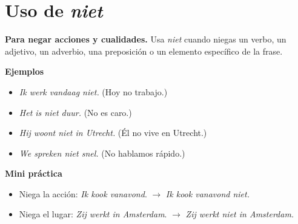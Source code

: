 \section{Uso de \textit{niet}}
\textbf{Para negar acciones y cualidades.} Usa \textit{niet} cuando niegas un verbo, un adjetivo, un adverbio, una preposición o un elemento específico de la frase.

\textbf{Ejemplos}
\begin{itemize}[leftmargin=*]
  \item \textit{Ik werk vandaag niet.} (Hoy no trabajo.)
  \item \textit{Het is niet duur.} (No es caro.)
  \item \textit{Hij woont niet in Utrecht.} (Él no vive en Utrecht.)
  \item \textit{We spreken niet snel.} (No hablamos rápido.)
\end{itemize}

\textbf{Mini práctica}
\begin{itemize}[leftmargin=*]
  \item Niega la acción: \textit{Ik kook vanavond}. $\rightarrow$ \textit{Ik kook vanavond niet.}
  \item Niega el lugar: \textit{Zij werkt in Amsterdam}. $\rightarrow$ \textit{Zij werkt niet in Amsterdam.}
\end{itemize}
